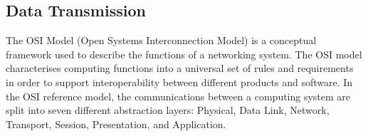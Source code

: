 \documentclass[../report.tex]{subfiles}
\begin{document}








\pagebreak

\subsection{Data Transmission} %

The OSI Model (Open Systems Interconnection Model) is a conceptual framework used to describe the functions of a networking system. The OSI model characterises computing functions into a universal set of rules and requirements in order to support interoperability between different products and software. In the OSI reference model, the communications between a computing system are split into seven different abstraction layers: Physical, Data Link, Network, Transport, Session, Presentation, and Application.
\end{document}
